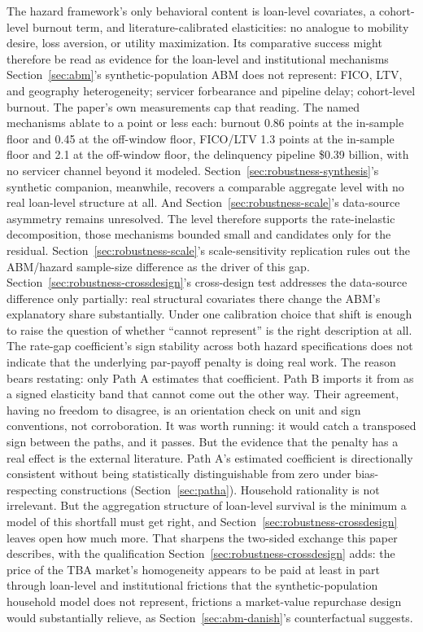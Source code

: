 \documentclass[12pt]{article}
\begin{document}
The hazard framework's only behavioral content is loan-level covariates, a cohort-level burnout term, and literature-calibrated elasticities: no analogue to mobility desire, loss aversion, or utility maximization. Its comparative success might therefore be read as evidence for the loan-level and institutional mechanisms Section~\ref{sec:abm}'s synthetic-population ABM does not represent: FICO, LTV, and geography heterogeneity; servicer forbearance and pipeline delay; cohort-level burnout. The paper's own measurements cap that reading. The named mechanisms ablate to a point or less each: burnout 0.86 points at the in-sample floor and 0.45 at the off-window floor, FICO/LTV 1.3 points at the in-sample floor and 2.1 at the off-window floor, the delinquency pipeline \$0.39 billion, with no servicer channel beyond it modeled. Section~\ref{sec:robustness-synthesis}'s synthetic companion, meanwhile, recovers a comparable aggregate level with no real loan-level structure at all. And Section~\ref{sec:robustness-scale}'s data-source asymmetry remains unresolved. The level therefore supports the rate-inelastic decomposition, those mechanisms bounded small and candidates only for the residual. Section~\ref{sec:robustness-scale}'s scale-sensitivity replication rules out the ABM/hazard sample-size difference as the driver of this gap. Section~\ref{sec:robustness-crossdesign}'s cross-design test addresses the data-source difference only partially: real structural covariates there change the ABM's explanatory share substantially. Under one calibration choice that shift is enough to raise the question of whether ``cannot represent'' is the right description at all. The rate-gap coefficient's sign stability across both hazard specifications does not indicate that the underlying par-payoff penalty is doing real work. The reason bears restating: only Path A estimates that coefficient. Path B imports it from \citet{liebersohn2024} as a signed elasticity band that cannot come out the other way. Their agreement, having no freedom to disagree, is an orientation check on unit and sign conventions, not corroboration. It was worth running: it would catch a transposed sign between the paths, and it passes. But the evidence that the penalty has a real effect is the external literature. Path A's estimated coefficient is directionally consistent without being statistically distinguishable from zero under bias-respecting constructions (Section~\ref{sec:patha}). Household rationality is not irrelevant. But the aggregation structure of loan-level survival is the minimum a model of this shortfall must get right, and Section~\ref{sec:robustness-crossdesign} leaves open how much more. That sharpens the two-sided exchange this paper describes, with the qualification Section~\ref{sec:robustness-crossdesign} adds: the price of the TBA market's homogeneity appears to be paid at least in part through loan-level and institutional frictions that the synthetic-population household model does not represent, frictions a market-value repurchase design would substantially relieve, as Section~\ref{sec:abm-danish}'s counterfactual suggests.
\clearpage
\end{document}
